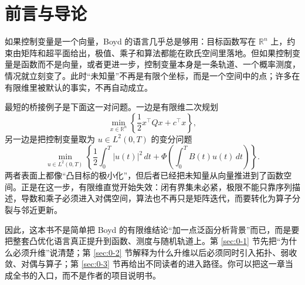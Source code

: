 \chapter{前言与导论}

\label{chap:00}

如果控制变量是一个向量，Boyd 的语言几乎总是够用：目标函数写在 $\mathbb R^n$ 上，约束由矩阵和超平面给出，极值、乘子和算法都能在欧氏空间里落地。但如果控制变量是函数而不是向量，或者更进一步，控制变量本身是一条轨道、一个概率测度，情况就立刻变了。此时“未知量”不再是有限个坐标，而是一个空间中的点；许多在有限维里被默认的事实，不再自动成立。

最短的桥接例子是下面这一对问题。一边是有限维二次规划
\[
\min_{x\in\mathbb R^n}\left\{\frac12 x^\top Qx+c^\top x\right\},
\]
另一边是把控制变量取为 $u\in L^2(0,T)$ 的变分问题
\[
\min_{u\in L^2(0,T)}
\left\{
\frac12\int_0^T |u(t)|^2\,dt+\Phi\!\left(\int_0^T B(t)u(t)\,dt\right)
\right\}.
\]
两者表面上都像“凸目标的极小化”，但后者已经把未知量从向量推进到了函数空间。正是在这一步，有限维直觉开始失效：闭有界集未必紧，极限不能只靠序列描述，导数和乘子必须进入对偶空间，算法也不再只是矩阵迭代，而要转化为算子分裂与邻近更新。

因此，这本书不是简单把 Boyd 的有限维结论“加一点泛函分析背景”而已，而是要把整套凸优化语言真正提升到函数、测度与随机轨道上。第 \ref{sec:0-1} 节先把“为什么必须升维”说清楚；第 \ref{sec:0-2} 节解释为什么升维以后必须同时引入拓扑、弱收敛、对偶与算子；第 \ref{sec:0-3} 节再给出不同读者的进入路径。你可以把这一章当成全书的入口，而不是作者的项目说明书。






